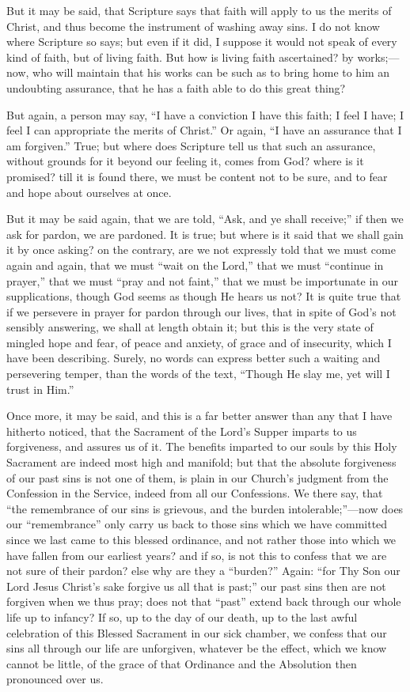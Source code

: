 But it may be said, that Scripture says that faith will apply to us
the merits of Christ, and thus become the instrument of washing away
sins. I do not know where Scripture so says; but even if it did, I
suppose it would not speak of every kind of faith, but of living
faith. But how is living faith ascertained? by works;—now, who will
maintain that his works can be such as to bring home to him an
undoubting assurance, that he has a faith able to do this great thing?

But again, a person may say, ``I have a conviction I have this
faith; I feel I have; I feel I can appropriate the merits of
Christ.'' Or again, ``I have an assurance that I am
forgiven.'' True; but where does Scripture tell us that such an
assurance, without grounds for it beyond our feeling it, comes from
God? where is it promised? till it is found there, we must be content
not to be sure, and to fear and hope about ourselves at once.

But it may be said again, that we are told, ``Ask, and ye shall
receive;'' if then we ask for pardon, we are pardoned. It is true;
but where is it said that we shall gain it by once asking? on the
contrary, are we not expressly told that we must come again and again,
that we must ``wait on the Lord,'' that we must ``continue
in prayer,'' that we must ``pray and not faint,'' that we
must be importunate in our supplications, though God seems as though
He hears us not? It is quite true that if we persevere in prayer for
pardon through our lives, that in spite of God's not sensibly
answering, we shall at length obtain it; but this is the very state of
mingled hope and fear, of peace and anxiety, of grace and of
insecurity, which I have been describing. Surely, no words can express
better such a waiting and persevering temper, than the words of the
text, ``Though He slay me, yet will I trust in Him.''

Once more, it may be said, and this is a far better answer than any
that I have hitherto noticed, that the Sacrament of the Lord's Supper
imparts to us forgiveness, and assures us of it. The benefits imparted
to our souls by this Holy Sacrament are indeed most high and manifold;
but that the absolute forgiveness of our past sins is not one of them,
is plain in our Church's judgment from the Confession in the Service,
indeed from all our Confessions. We there say, that ``the
remembrance of our sins is grievous, and the burden intolerable;''—now
does our ``remembrance'' only carry us back to those sins
which we have committed since we last came to this blessed ordinance,
and not rather those into which we have fallen from our earliest
years? and if so, is not this to confess that we are not sure of their
pardon? else why are they a ``burden?'' Again: ``for Thy
Son our Lord Jesus Christ's sake forgive us all that is past;''
our past sins then are not forgiven when we thus pray; does not that
``past'' extend back through our whole life up to infancy? If
so, up to the day of our death, up to the last awful celebration of
this Blessed Sacrament in our sick chamber, we confess that our sins
all through our life are unforgiven, whatever be the effect, which we
know cannot be little, of the grace of that Ordinance and the
Absolution then pronounced over us.


